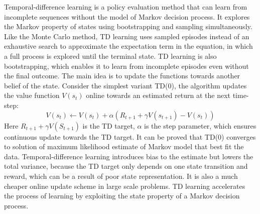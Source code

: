 \documentclass[oneside,11pt,a4paper]{article}
\begin{document}
\noindent
Temporal-difference learning is a policy evaluation method that can learn from incomplete sequences without the model of Markov decision process. It explores the Markov property of states using bootstrapping and sampling simultaneously. Like the Monte Carlo method, TD learning uses sampled episodes instead of an exhaustive search to approximate the expectation term in the equation, in which a full process is explored until the terminal state. TD learning is also bootstrapping, which enables it to learn from incomplete episodes even without the final outcome. The main idea is to update the functions towards another belief of the state. Consider the simplest variant TD(0), the algorithm updates the value function $V(s_t)$ online towards an estimated return at the next time-step:
$$
V(s_t)\leftarrow V(s_t)+\alpha(R_{t+1}+\gamma V(s_{t+1})-V(s_t))
$$
Here $R_{t+1}+\gamma V(S_{t+1})$ is the TD target, $\alpha$ is the step parameter, which ensures continuous update towards the TD target. It can be proved that TD(0) converges to solution of maximum likelihood estimate of Markov model that best fit the data. Temporal-difference learning introduces bias to the estimate but lowers the total variance, because the TD target only depends on one state transition and reward, which can be a result of poor state representation. It is also a much cheaper online update scheme in large scale problems. TD learning accelerates the process of learning by exploiting the state property of a Markov decision process.
\newline
\newline
\noindent
\end{document}
